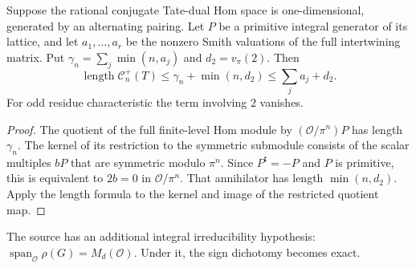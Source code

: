 \begin{proposition}
\label{prop:opposite-sign}
Suppose the rational conjugate Tate-dual Hom space is one-dimensional,
generated by an alternating pairing.  Let $P$ be a primitive integral
generator of its lattice, and let $a_1,\dots,a_r$ be the nonzero Smith
valuations of the full intertwining matrix.  Put
$\gamma_n=\sum_j\min(n,a_j)$ and
$d_2=v_\pi(2)$.  Then
\[
 \operatorname{length}\mathcal C_n^+(T)
 \le \gamma_n+\min(n,d_2)
 \le\sum_j a_j+d_2.
\]
For odd residue characteristic the term involving $2$ vanishes.
\end{proposition}
\begin{proof}
The quotient of the full finite-level Hom module by
$(\mathcal O/\pi^n)P$ has length $\gamma_n$.
The kernel of its restriction to the symmetric submodule consists of
the scalar multiples $bP$ that are symmetric modulo $\pi^n$.
Since $P^{\mathsf t}=-P$ and $P$ is primitive, this is equivalent to
$2b=0$ in $\mathcal O/\pi^n$.
That annihilator has length $\min(n,d_2)$.  Apply the length formula
to the kernel and image of the restricted quotient map.
\end{proof}

The source has an additional integral irreducibility hypothesis:
$\operatorname{span}_{\mathcal O}\rho(G)=M_d(\mathcal O)$.
Under it, the sign dichotomy becomes exact.

